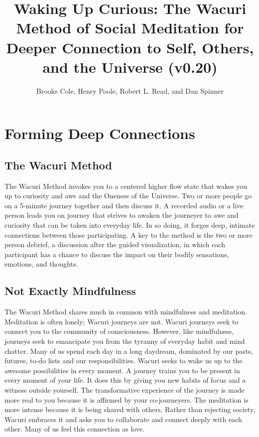 \documentclass[12pt]{book}
\begin{document}
\title{Waking Up Curious: The Wacuri Method of Social Meditation for Deeper Connection to Self, Others, and the Universe (v0.20)}

\author{Brooks Cole, Henry Poole, Robert L. Read, and Dan Spinner}
\date{ }

\maketitle
\tableofcontents


\chapter{Forming Deep Connections}

\section{The Wacuri Method}

The Wacuri Method invokes  you  to a centered higher flow state that wakes you up to curiosity and awe and the Oneness of the Universe. Two or more people go on a 5-minute journey together and then discuss it. A recorded audio or a live person leads you on  journey that strives to awaken the journeyer to awe and curiosity that can be taken into everyday life. In so doing, it forges deep, intimate connections between those participating. A key to the method is the two or more person debrief, a discussion after the guided visualization, in which each participant has a chance to discuss the impact on their bodily sensations, emotions, and thoughts.


\section{Not Exactly Mindfulness}

The Wacuri Method shares much in common with mindfulness and meditation. Meditation is often lonely; Wacuri journeys are not. Wacuri journeys seek to connect you to the community of consciousness. However, like mindfulness, journeys seek to emancipate you from the tyranny of everyday habit and mind chatter. Many of us spend each day in a long daydream, dominated by our pasts, futures, to-do lists and our responsibilities. Wacuri seeks to wake us up to the awesome possibilities in every moment. A journey trains you to be present in every moment of your life. It does this by giving you new habits of focus and a witness outside yourself. The transformative experience of the journey is made more real to you because it is affirmed by your co-journeyers. The meditation is more intense because it is being shared with others. Rather than rejecting society, Wacuri embraces it and asks you to collaborate and connect deeply with each other.
Many of us feel this connection as love.
\end{document}
